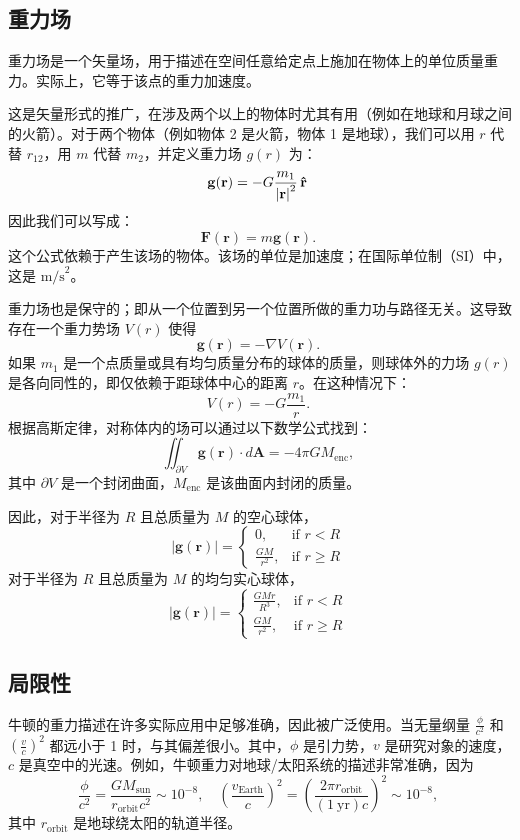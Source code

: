 \subsection{重力场}  
重力场是一个矢量场，用于描述在空间任意给定点上施加在物体上的单位质量重力。实际上，它等于该点的重力加速度。

这是矢量形式的推广，在涉及两个以上的物体时尤其有用（例如在地球和月球之间的火箭）。对于两个物体（例如物体 2 是火箭，物体 1 是地球），我们可以用 \( r \) 代替 \( r_{12} \)，用 \( m \) 代替 \( m_2 \)，并定义重力场 \( g(r) \) 为：
\[
\mathbf {g} (\mathbf {r} )=-G{m_{1} \over {{\vert \mathbf {r} \vert }^{2}}}\,\mathbf {\hat {r}}~
\]
因此我们可以写成：
\[
\mathbf {F} (\mathbf {r} )=m\mathbf {g} (\mathbf {r} ).~
\]
这个公式依赖于产生该场的物体。该场的单位是加速度；在国际单位制（SI）中，这是 \( \text{m/s}^2 \)。

重力场也是保守的；即从一个位置到另一个位置所做的重力功与路径无关。这导致存在一个重力势场 \( V(r) \) 使得
\[
\mathbf {g} (\mathbf {r} )=-\nabla V(\mathbf {r} ).~
\]
如果 \( m_1 \) 是一个点质量或具有均匀质量分布的球体的质量，则球体外的力场 \( g(r) \) 是各向同性的，即仅依赖于距球体中心的距离 \( r \)。在这种情况下：
\[
V(r) = -G \frac{m_1}{r}.~
\]
根据高斯定律，对称体内的场可以通过以下数学公式找到：
\[
\iint_{\partial V} \mathbf{g(r)} \cdot d\mathbf{A} = -4 \pi G M_{\text{enc}},~
\]
其中 \( \partial V \) 是一个封闭曲面，\( M_{\text{enc}} \) 是该曲面内封闭的质量。

因此，对于半径为 \( R \) 且总质量为 \( M \) 的空心球体，
\[
|\mathbf{g(r)}| = 
\begin{cases} 
0, & \text{if } r < R \\ 
\frac{GM}{r^2}, & \text{if } r \geq R 
\end{cases}~
\]
对于半径为 \( R \) 且总质量为 \( M \) 的均匀实心球体，
\[
|\mathbf{g(r)}| = 
\begin{cases} 
\frac{GMr}{R^3}, & \text{if } r < R \\ 
\frac{GM}{r^2}, & \text{if } r \geq R 
\end{cases}~
\]

\subsection{局限性}
牛顿的重力描述在许多实际应用中足够准确，因此被广泛使用。当无量纲量 \(\frac{\phi}{c^2}\) 和 \(\left(\frac{v}{c}\right)^2\) 都远小于 1 时，与其偏差很小。其中，\(\phi\) 是引力势，\(v\) 是研究对象的速度，\(c\) 是真空中的光速。例如，牛顿重力对地球/太阳系统的描述非常准确，因为
\[
\frac{\phi}{c^2} = \frac{GM_{\text{sun}}}{r_{\text{orbit}} c^2} \sim 10^{-8}, \quad \left(\frac{v_{\text{Earth}}}{c}\right)^2 = \left(\frac{2 \pi r_{\text{orbit}}}{(1\ \text{yr}) c}\right)^2 \sim 10^{-8},~
\]
其中 \(r_{\text{orbit}}\) 是地球绕太阳的轨道半径。

